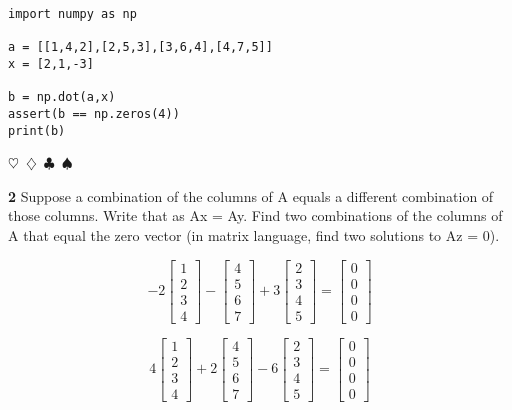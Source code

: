 \documentclass{article}
\newcommand{\sep}{\begin{center}$\heartsuit$~$\diamondsuit$~$\clubsuit$~$\spadesuit$\end{center}}
\begin{document}
\begin{verbatim}
import numpy as np

a = [[1,4,2],[2,5,3],[3,6,4],[4,7,5]]
x = [2,1,-3]

b = np.dot(a,x)
assert(b == np.zeros(4))
print(b)
\end{verbatim}

\sep

\noindent\textbf{2} Suppose a combination of the columns of A equals a different combination of those 
columns. Write that as Ax = Ay. Find two combinations of the columns of A that
equal the zero vector (in matrix language, find two solutions to Az = 0).

\begin{displaymath}
-2 \begin{bmatrix} 1 \\ 2 \\ 3 \\ 4 \end{bmatrix}
- \begin{bmatrix} 4 \\ 5 \\ 6 \\ 7 \end{bmatrix}
+ 3 \begin{bmatrix} 2 \\ 3 \\ 4 \\ 5 \end{bmatrix}
= \begin{bmatrix} 0 \\ 0 \\ 0 \\ 0 \end{bmatrix}
\end{displaymath}

\begin{displaymath}
4 \begin{bmatrix} 1 \\ 2 \\ 3 \\ 4 \end{bmatrix}
+ 2 \begin{bmatrix} 4 \\ 5 \\ 6 \\ 7 \end{bmatrix}
- 6 \begin{bmatrix} 2 \\ 3 \\ 4 \\ 5 \end{bmatrix}
= \begin{bmatrix} 0 \\ 0 \\ 0 \\ 0 \end{bmatrix}
\end{displaymath}
\end{document}
